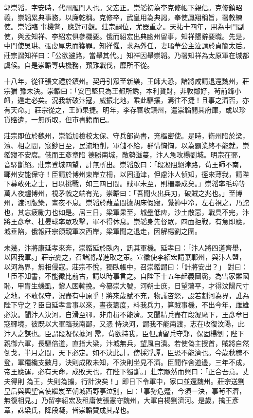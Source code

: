 
\begin{pinyinscope}

 郭崇韜，字安時，代州雁門人也。父宏正。崇韜初為李克修帳下親信。克修鎮昭義，崇韜累典事務，以廉乾稱。克修卒，武皇用為典謁，奉使鳳翔稱旨，署教練使。崇韜臨
 事機警，應對可觀。莊宗嗣位，尤器重之。天祐十四年，用為中門副使，與孟知祥、李紹宏俱參機要。俄而紹宏出典幽州留事，知祥懇辭要職。先是，中門使吳珙、張虔厚忠而獲罪。知祥懼，求為外任，妻璚華公主泣請於貞簡太后。莊宗謂知祥曰：「公欲避路，當舉其代。」知祥因舉崇韜。乃署知祥為太原軍在城都虞候。自是崇韜專典機務，艱難戰伐，靡所不從。



 十八年，從征張文禮於鎮州。契丹引眾至新樂，王師大恐，諸將咸請退還魏州，莊宗猶
 豫未決。崇韜曰：「安巴堅只為王都所誘，本利貨財，非敦鄰好，茍前鋒小衄，遁走必矣。況我新破汴寇，威振北地，乘此驅攘，焉往不捷！且事之濟否，亦有天命。」莊宗從之，王師果捷。明年，李存審收鎮州，遣崇韜閱其府庫，或以珍貨賂遺，一無所取，但市書籍而已。



 莊宗即位於魏州，崇韜加檢校太保、守兵部尚書，充樞密使。是時，衛州陷於梁，澶、相之間，寇鈔日至，民流地削，軍儲不給，群情恟恟，以為霸業終不能就，崇韜寢不安席。俄而王彥章陷
 德勝南城，敵勢滋蔓，汴人急攻楊劉城。明宗在鄆，音驛斷絕。莊宗登城四望，計無所出。崇韜啟曰：「段凝阻絕津路，茍王師不南，鄆州安能保守！臣請於博州東岸立柵，以固通津，但慮汴人偵知，徑來薄我，請陛下募敢死之士，日以挑戰，如三四日間。賊軍未至，則柵壘成矣。」崇韜率毛璋等萬人夜趨博州，視矛戟之端有光，崇韜曰：「吾聞火出兵刃，破賊之兆也。」至博州，渡河版築，晝夜不息。崇韜於葭葦間據胡床假寢，覺褲中冷，左右視之，乃蛇
 也，其忘疲勵力也如是。居三日，梁軍果至，城壘低庳，沙土散惡，戰具不完，汴將王彥章、杜晏球率眾攻擊，軍不得休息。崇韜身先督眾，四面拒戰，有急即應，城垂陷，俄報莊宗領親軍次西岸，梁軍聞之退走，因解楊劉之圍。



 未幾，汴將康延孝來奔，崇韜延於臥內，訊其軍機。延孝曰：「汴人將四道齊舉，以困我軍。」莊宗憂之，召諸將謀進取之策。宣徽使李紹宏請棄鄆州，與汴人盟，以河為界，無相侵寇。莊宗不悅，獨臥帳中，召崇韜謂曰：「計將安出？」
 對曰：「臣不知書，不能徵比前古，請以時事言之。自陛下十五年起義圖霸，為雪家讎國恥，甲胄生蟣虱，黎人困輸挽。今纂崇大號，河朔士庶，日望蕩平，才得汶陽尺寸之地，不敢保守，況盡有中原乎！將來歲賦不充，物議咨怨，設若劃河為界，誰為陛下守之？臣自延孝言事以來，晝夜籌度，料我兵力，算賊事機，不出今年，雌雄必決。聞汴人決河，自滑至鄆，非舟楫不能濟。又聞精兵盡在段凝麾下，王彥章日寇鄆境，彼既以大軍臨我南鄙，又憑
 恃決河，謂我不能南渡，志在收復汶陽，此汴人之謀也。臣謂段凝保據河需，茍欲持我，臣但請留兵守鄴，保固楊劉；陛下親御六軍，長驅倍道，直指大梁，汴城無兵，望風自潰。若使偽主授首，賊將自然倒戈，半月之間，天下必定。如不決此計，傍採浮譚，臣恐不能濟也。今歲秋稼不登，軍糧纔支數月，決則成敗未知，不決則坐見不濟。臣聞作舍道邊，三年不成，帝王應運，必有天命，成敗天也，在陛下獨斷。」莊宗蹶然而興曰：「正合吾意。丈夫得則
 為王，失則為擄，行計決矣！」即日下令軍中，家口並還魏州。莊宗送劉皇后與興聖宮使繼岌至朝城西野亭泣別，曰：「事勢危蹙，今須一決，事茍不濟，無復相見。」乃留李紹宏及租庸使張憲守魏州，大軍自楊劉濟河。是歲，擒王彥章，誅梁氏，降段凝，皆崇韜贊成其謀也。




\end{pinyinscope}
